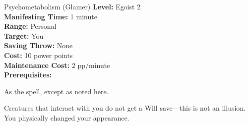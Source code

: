 {Psychometabolism (Glamer)}
{
	\textbf{Level:}
	Egoist 2\\
	\textbf{Manifesting Time:}
	1 minute\\
	\textbf{Range:}
	Personal\\
	\textbf{Target:}
	You\\
	\textbf{Saving Throw:}
	None\\
	\textbf{Cost:}
	10 power points\\
	\textbf{Maintenance Cost:}
	2 pp/minute\\
	\textbf{Prerequisites:}
	\\
}
{
	As the  spell, except as noted here.

	Creatures that interact with you do not get a Will save---this is not an illusion. You physically changed your appearance.
}
